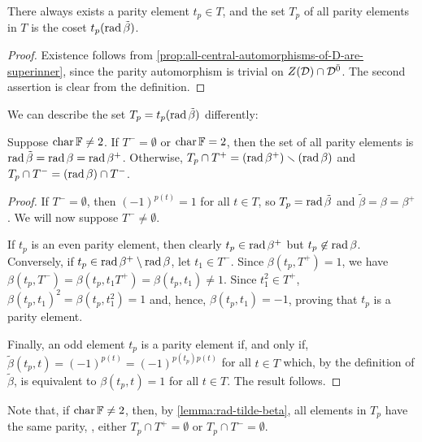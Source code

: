 \begin{cor}\label{cor:existence-parity-element}
    There always exists a parity element $t_p \in T$, and 
    the set $T_p$ of all parity elements in $T$ is the coset $t_p (\operatorname{rad} \tilde\beta)$. 
\end{cor}

\begin{proof}
    Existence follows from \cref{prop:all-central-automorphisms-of-D-are-superinner}, since the parity automorphism is trivial on $Z(\mathcal{D}) \cap \mathcal{D}^{\bar0}$. 
    The second assertion is clear from the definition. 
\end{proof}

We can describe the set $T_p = t_p (\operatorname{rad} \tilde\beta)$ differently: 

\begin{lemma}\label{lemma:set-parity-elements}
    Suppose $\operatorname{char} \mathbb{F} \neq 2$. 
    If $T^- =\emptyset$ or $\operatorname{char} \mathbb{F} =2$, then the set of all parity elements is $\operatorname{rad} \tilde\beta = \operatorname{rad} \beta = \operatorname{rad} \beta^+$. 
    Otherwise, $T_p \cap T^+ = (\operatorname{rad} \beta^+) \smallsetminus (\operatorname{rad}\beta)$ and $T_p \cap T^- = (\operatorname{rad} \beta) \cap T^-$. 
\end{lemma}

\begin{proof}
    If $T^- =\emptyset$, then $(-1)^{p(t)} = 1$ for all $t\in T$, so $T_p = \operatorname{rad} \tilde\beta$ and $\tilde\beta = \beta = \beta^+$. 
    We will now suppose $T^- \neq\emptyset$.
    
    If $t_p$ is an even parity element, then clearly $t_p \in \operatorname{rad}\beta^+$ but $t_p \not\in \operatorname{rad} \beta$. 
    Conversely, if $t_p \in \operatorname{rad} \beta^+ \setminus \operatorname{rad}\beta$, let $t_1\in T^-$. 
    Since $\beta(t_p, T^+) = 1$, we have $\beta(t_p, T^-) = \beta(t_p, t_1 T^+) = \beta(t_p, t_1) \neq 1$. 
    Since $t_1^2 \in T^+$, $\beta(t_p, t_1)^2 = \beta(t_p, t_1^2) = 1$ and, hence, $\beta(t_p, t_1) = - 1$, proving that $t_p$ is a parity element. 
    
    Finally, an odd element $t_p$ is a parity element if, and only if, $\tilde\beta(t_p, t) = (-1)^{p(t)} = (-1)^{p(t_p) p(t)}$ for all $t\in T$ which, by the definition of $\tilde\beta$, is equivalent to $\beta(t_p, t) = 1$ for all $t\in T$. 
    The result follows. 
\end{proof} 

Note that, if $\operatorname{char} \mathbb{F} \neq 2$, then, by \cref{lemma:rad-tilde-beta}, all elements in $T_p$ have the same parity, \ie, either $T_p \cap T^+ = \emptyset$ or $T_p \cap T^- = \emptyset$. 

